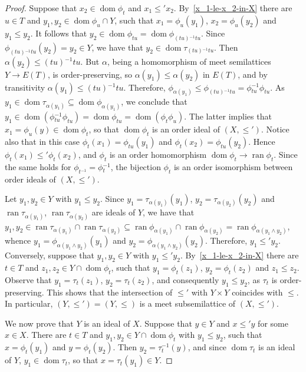\documentclass[reqno]{amsart}
\theoremstyle{definition}
\newcommand{\dom}[1]{\operatorname{\mathrm{dom}}{#1}}
\newcommand{\ran}[1]{\operatorname{\mathrm{ran}}{#1}}
\newcommand{\m}{{}^{-1}}
\newcommand{\0}{\theta}
\newcommand{\af}{\alpha}
\newcommand{\sst}{\subseteq}
\newcommand{\mt}{\wedge}
\begin{document}
\begin{proof}
	Suppose that $x_2\in\dom{\phi_t}$ and $x_1\le'x_2$. By~\eqref{x_1-le-x_2-in-X} there are $u\in T$ and $y_1,y_2\in\dom{\phi_u}\cap Y$, such that $x_1=\phi_u(y_1)$, $x_2=\phi_u(y_2)$ and $y_1\le y_2$. It follows that $y_2\in\dom{\phi_{tu}}=\dom{\phi_{(tu)\m tu}}$. Since $\phi_{(tu)\m tu}(y_2)=y_2\in Y$, we have that $y_2\in\dom{\tau_{(tu)\m tu}}$. Then $\af(y_2)\le (tu)\m tu$. But $\af$, being a homomorphism of meet semilattices $Y\to E(T)$, is order-preserving, so $\af(y_1)\le\af(y_2)$ in $E(T)$, and by transitivity $\af(y_1)\le(tu)\m tu$. Therefore, $\phi_{\af(y_1)}\le\phi_{(tu)\m tu}=\phi\m_{tu}\phi_{tu}$. As $y_1\in\dom{\tau_{\af(y_1)}}\sst\dom{\phi_{\af(y_1)}}$, we conclude that $y_1\in\dom{(\phi\m_{tu}\phi_{tu})}=\dom{\phi_{tu}}=\dom{(\phi_t\phi_u)}$. The latter implies that $x_1=\phi_u(y)\in\dom{\phi_t}$, so that $\dom{\phi_t}$ is an order ideal of $(X,\le')$. Notice also that in this case $\phi_t(x_1)=\phi_{tu}(y_1)$ and $\phi_t(x_2)=\phi_{tu}(y_2)$. Hence $\phi_t(x_1)\le'\phi_t(x_2)$, and $\phi_t$ is an order homomorphism $\dom{\phi_t}\to\ran{\phi_t}$. Since the same holds for $\phi_{t\m}=\phi\m_t$, the bijection $\phi_t$ is an order isomorphism between order ideals of $(X,\le')$.
	
	Let $y_1,y_2\in Y$ with $y_1\le y_2$. Since $y_1=\tau_{\af(y_1)}(y_1)$, $y_2=\tau_{\af(y_2)}(y_2)$ and $\ran{\tau_{\af(y_1)}}$, $\ran{\tau_{\af(y_2)}}$ are ideals of $Y$, we have that $y_1,y_2\in\ran{\tau_{\af(y_1)}}\cap\ran{\tau_{\af(y_2)}}\sst\ran{\phi_{\af(y_1)}}\cap\ran{\phi_{\af(y_2)}}=\ran{\phi_{\af(y_1\mt y_2)}}$, whence $y_1=\phi_{\af(y_1\mt y_2)}(y_1)$ and $y_2=\phi_{\af(y_1\mt y_2)}(y_2)$. Therefore, $y_1\le' y_2$. Conversely, suppose that $y_1,y_2\in Y$ with $y_1\le' y_2$. By~\eqref{x_1-le-x_2-in-X} there are $t\in T$ and $z_1,z_2\in Y\cap\dom{\phi_t}$, such that $y_1=\phi_t(z_1)$, $y_2=\phi_t(z_2)$ and $z_1\le z_2$. Observe that $y_1=\tau_t(z_1)$, $y_2=\tau_t(z_2)$, and consequently $y_1\le y_2$, as $\tau_t$ is order-preserving. This shows that the intersection of $\le'$ with $Y\times Y$ coincides with $\le$. In particular, $(Y,\le')=(Y,\le)$ is a meet subsemilattice of $(X,\le')$.
	
	We now prove that $Y$ is an ideal of $X$. Suppose that $y\in Y$ and $x\le' y$ for some $x\in X$. There are $t\in T$ and $y_1,y_2\in Y\cap\dom{\phi_t}$ with $y_1\le y_2$, such that $x=\phi_t(y_1)$ and $y=\phi_t(y_2)$. Then $y_2=\tau\m_t(y)$, and since $\dom{\tau_t}$ is an ideal of $Y$, $y_1\in \dom{\tau_t}$, so that $x=\tau_t(y_1)\in Y$.
\end{proof}
\end{document}
